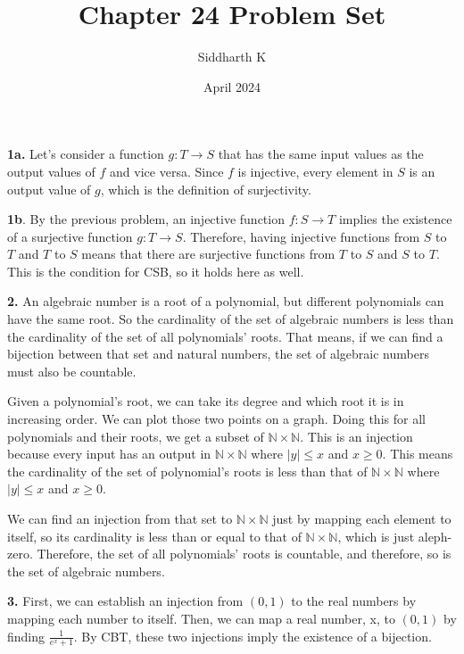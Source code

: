 \documentclass{article}
\title{Chapter 24 Problem Set}
\author{Siddharth K}
\date{April 2024}
\begin{document}
\maketitle

\textbf{1a.} Let's consider a function $g: T \rightarrow S$ that has the same input values as the output values of $f$ and vice versa. Since $f$ is injective, every element in $S$ is an output value of $g$, which is the definition of surjectivity.
\newline

\textbf{1b}. By the previous problem, an injective function $f: S \rightarrow T$ implies the existence of a surjective function $g: T \rightarrow S$. Therefore, having injective functions from $S$ to $T$ and $T$ to $S$ means that there are surjective functions from $T$ to $S$ and $S$ to $T$. This is the condition for CSB, so it holds here as well.
\newline

\textbf{2.} An algebraic number is a root of a polynomial, but different polynomials can have the same root. So the cardinality of the set of algebraic numbers is less than the cardinality of the set of all polynomials' roots. That means, if we can find a bijection between that set and natural numbers, the set of algebraic numbers must also be countable.
\newline

Given a polynomial's root, we can take its degree and which root it is in increasing order. We can plot those two points on a graph. Doing this for all polynomials and their roots, we get a subset of $\mathbb{N} \times \mathbb{N}$. This is an injection because every input has an output in $\mathbb{N} \times \mathbb{N}$ where $|y| \le x$ and $x \ge 0$. This means the cardinality of the set of polynomial's roots is less than that of $\mathbb{N}\times \mathbb{N}$ where $|y| \le x$ and $x \ge 0$.
\newline

We can find an injection from that set to $\mathbb{N} \times \mathbb{N}$ just by mapping each element to itself, so its cardinality is less than or equal to that of $\mathbb{N} \times \mathbb{N}$, which is just aleph-zero. Therefore, the set of all polynomials' roots is countable, and therefore, so is the set of algebraic numbers.
\newline

\textbf{3.} First, we can establish an injection from $(0, 1)$ to the real numbers by mapping each number to itself. Then, we can map a real number, x, to $(0, 1)$ by finding $\frac{1}{e^x + 1}$. By CBT, these two injections imply the existence of a bijection.
\newline
\end{document}
